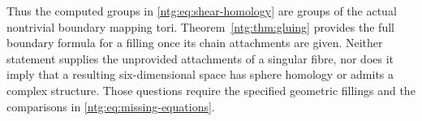 Thus the computed groups in \eqref{ntg:eq:shear-homology} are groups
of the actual nontrivial boundary mapping tori. Theorem~\ref{ntg:thm:gluing}
provides the full boundary formula for a filling once its chain
attachments are given. Neither statement supplies the unprovided
attachments of a singular fibre, nor does it imply that a resulting
six-dimensional space has sphere homology or admits a complex
structure. Those questions require the specified geometric fillings
and the comparisons in \eqref{ntg:eq:missing-equations}.
